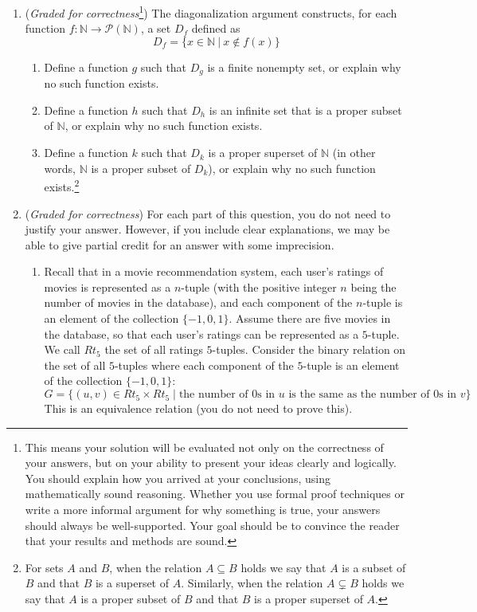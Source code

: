 \documentclass[12pt, oneside]{article}
\begin{document}
\begin{enumerate}
    \item ({\it Graded for correctness}\footnote{This means your solution will be
    evaluated not only on the correctness of your answers, but on your ability to 
    present your ideas clearly and logically. You should explain how you arrived at 
    your conclusions, using 
    mathematically sound reasoning. Whether you use formal proof techniques or 
    write a more informal argument for why 
    something is true, your answers should always be well-supported. Your goal 
    should be to convince the reader that 
    your results and methods are sound.})
    The diagonalization argument constructs, for each function 
    $f: \mathbb{N} \to \mathcal{P}(\mathbb{N})$, a set $D_f$ defined as
    \[
    D_f = \{ x \in \mathbb{N} ~|~ x \notin f(x) \}
    \]
    \begin{enumerate}
        \item Define a function $g$ such that $D_g$ is a finite nonempty set, 
        or explain why no such function exists.
        \item Define a function $h$ such that $D_h$ is an infinite set that is a proper subset of 
        $\mathbb{N}$, or explain why no such function exists.
        \item Define a function $k$ such that $D_k$ is a proper superset
        of $\mathbb{N}$ (in other words, $\mathbb{N}$ is a proper subset 
        of $D_k$), or explain why no such function exists.\footnote{
        For sets $A$ and $B$, when the relation $A\subseteq B$ holds we say that $A$ 
        is a subset of $B$ and that $B$ is a superset of $A$. Similarly, when the relation 
        $A\subsetneq B$ holds we say that $A$ is a proper subset of $B$ and that $B$ is a 
        proper superset of $A$. 
        }
    \end{enumerate}    
    
    \item ({\it Graded for correctness}) For each part of this question, you do not need to justify your answer.  
    However, if you include clear explanations, 
    we may be able to give partial credit for an answer with some imprecision.
        
    \begin{enumerate}
    \item Recall that 
    in a movie recommendation system, each 
    user's ratings of movies is represented as a $n$-tuple (with the positive integer $n$ 
    being the number of movies in the database), and each component of 
    the $n$-tuple is an element of the collection $\{-1,0,1\}$. Assume there are five movies in the database, 
    so that each user's ratings
    can be represented as a $5$-tuple. We call $Rt_5$ the set of all ratings $5$-tuples.
    Consider the binary relation on the  set of all 
    $5$-tuples where each  component of the $5$-tuple is an element of the collection $\{-1,0,1\}$:
    \[
        G = \{ (u,v) \in Rt_5 \times Rt_5 \mid \text{the number of $0$s in $u$ is the same as the number of $0$s in $v$} \}
    \]
    This is an equivalence relation (you do not need to prove this).


\end{enumerate}
\end{enumerate}
\end{document}
